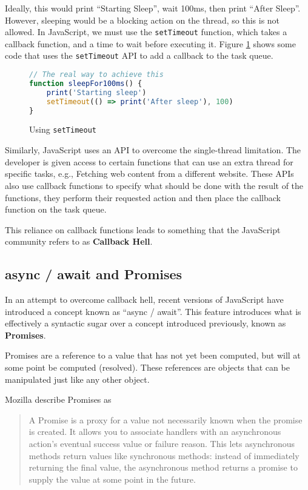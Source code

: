 Ideally, this would print ``Starting Sleep'', wait 100ms, then print ``After Sleep''. However, sleeping would be a blocking action on the thread, so this is not allowed. In JavaScript, we must use the \texttt{setTimeout} function, which takes a callback function, and a time to wait before executing it. Figure \ref{setTimeoutCode} shows some code that uses the \texttt{setTimeout} API to add a callback to the task queue.

\begin{figure}
    \caption{Using \texttt{setTimeout}}
    \label{setTimeoutCode}
    \begin{lstlisting}[language=javascript]
// The real way to achieve this
function sleepFor100ms() {
    print('Starting sleep')
    setTimeout(() => print('After sleep'), 100)
}
    \end{lstlisting}
\end{figure}

Similarly, JavaScript uses an API to overcome the single-thread limitation. The developer is given access to certain functions that can use an extra thread for specific tasks, e.g., Fetching web content from a different website. These APIs also use callback functions to specify what should be done with the result of the functions, they perform their requested action and then place the callback function on the task queue.

This reliance on callback functions leads to something that the JavaScript community refers to as \textbf{Callback Hell}\cite{callbackhell}.

\subsection{async / await and Promises}\label{background:asyncawait}

In an attempt to overcome callback hell, recent versions of JavaScript have introduced a concept known as ``async / await''.\cite{es8spec} This feature introduces what is effectively a syntactic sugar over a concept introduced previously, known as \textbf{Promises}.

Promises are a reference to a value that has not yet been computed, but will at some point be computed (resolved). These references are objects that can be manipulated just like any other object.

Mozilla describe Promises as
\begin{quote}
A Promise is a proxy for a value not necessarily known when the promise is created. It allows you to associate handlers with an asynchronous action's eventual success value or failure reason. This lets asynchronous methods return values like synchronous methods: instead of immediately returning the final value, the asynchronous method returns a promise to supply the value at some point in the future.
    \cite{mozillapromises}
\end{quote}

